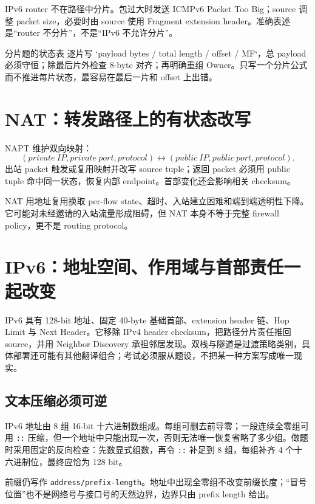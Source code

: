 \documentclass[11pt,a4paper]{ctexart}
\newcommand{\code}[1]{\texttt{#1}}
\begin{document}
IPv6 router 不在路径中分片。包过大时发送 ICMPv6 Packet Too Big；source 调整 packet size，必要时由 source 使用 Fragment extension header。准确表述是“router 不分片”，不是“IPv6 不允许分片”。

\begin{warnbox}{分片题的状态表}
逐片写 `payload bytes / total length / offset / MF`，总 payload 必须守恒；除最后片外检查 8-byte 对齐；再明确重组 Owner。只写一个分片公式而不推进每片状态，最容易在最后一片和 offset 上出错。
\end{warnbox}

\section{NAT：转发路径上的有状态改写}

NAPT 维护双向映射：
\[
(private\ IP,private\ port,protocol)
\leftrightarrow
(public\ IP,public\ port,protocol).
\]
出站 packet 触发或复用映射并改写 source tuple；返回 packet 必须用 public tuple 命中同一状态，恢复内部 endpoint。首部变化还会影响相关 checksum。

NAT 用地址复用换取 per-flow state、超时、入站建立困难和端到端透明性下降。它可能对未经邀请的入站流量形成阻碍，但 NAT 本身不等于完整 firewall policy，更不是 routing protocol。

\section{IPv6：地址空间、作用域与首部责任一起改变}

IPv6 具有 128-bit 地址、固定 40-byte 基础首部、extension header 链、Hop Limit 与 Next Header。它移除 IPv4 header checksum，把路径分片责任推回 source，并用 Neighbor Discovery 承担邻居发现。双栈与隧道是过渡策略类别，具体部署还可能有其他翻译组合；考试必须服从题设，不把某一种方案写成唯一现实。

\subsection{文本压缩必须可逆}

IPv6 地址由 8 组 16-bit 十六进制数组成。每组可删去前导零；一段连续全零组可用 \code{::} 压缩，但一个地址中只能出现一次，否则无法唯一恢复省略了多少组。做题时采用固定的反向检查：先数显式组数，再令 \code{::} 补足到 8 组，每组补齐 4 个十六进制位，最终应恰为 128 bit。

前缀仍写作 \code{address/prefix-length}。地址中出现全零组不改变前缀长度；“冒号位置”也不是网络号与接口号的天然边界，边界只由 prefix length 给出。
\end{document}

